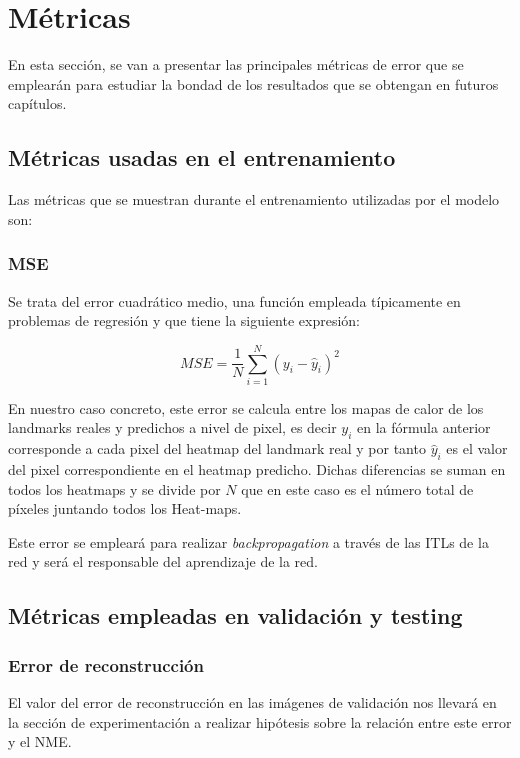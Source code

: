 \section{Métricas}

\noindent En esta sección, se van a presentar las principales métricas de error que se emplearán para estudiar la bondad de los resultados que se obtengan en futuros capítulos.

    \subsection{Métricas usadas en el entrenamiento}
        \noindent Las métricas que se muestran durante el entrenamiento utilizadas por el modelo son:

        \subsubsection{MSE}
            \noindent Se trata del error cuadrático medio, una función empleada típicamente en problemas de regresión y que tiene la siguiente expresión: 

            \begin{equation*}
                MSE = \frac{1}{N} \sum_{i=1}^{N} (y_i - \widehat{y}_i)^2
            \end{equation*}

            \noindent En nuestro caso concreto, este error se calcula entre los mapas de calor de los landmarks reales y predichos a nivel de pixel, es decir $y_i$ en la fórmula anterior corresponde a cada pixel del heatmap del landmark real y por tanto $\widehat{y}_i$ es el valor del pixel correspondiente en el heatmap predicho. Dichas diferencias se suman en todos los heatmaps y se divide por $N$ que en este caso es el número total de píxeles juntando todos los Heat-maps.

            \medskip

            \noindent Este error se empleará para realizar \textit{backpropagation} a través de las ITLs de la red y será el responsable del aprendizaje de la red.

    \subsection{Métricas empleadas en validación y testing}

        \subsubsection{Error de reconstrucción}
            \noindent El valor del error de reconstrucción en las imágenes de validación nos llevará en la sección de experimentación a realizar hipótesis sobre la relación entre este error y el NME.

